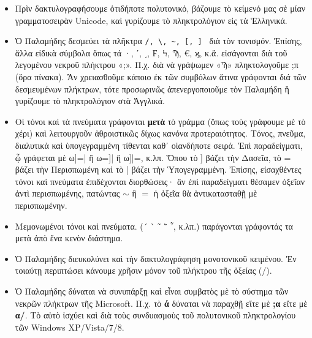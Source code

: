 \documentclass[12pt,a4paper]{article}
\begin{document}
\begin{itemize}
\begin{figure}[ht]
\begin{center}
                    \end{center}
                  \end{figure}
    \item{}Πρὶν δακτυλογραφήσουμε ὁτιδήποτε πολυτονικό, βάζουμε τὸ κείμενό 
          μας σὲ μίαν γραμματοσειρὰν Unicode, καὶ γυρίζουμε τὸ πληκτρολόγιον 
          εἰς τὰ Ἑλληνικά.
    \item{}Ὁ Παλαμήδης δεσμεύει τὰ πλῆκτρα \verb|/, \, ~, [, ] | διὰ τὸν
          τονισμόν. Ἐπίσης, ἄλλα εἰδικὰ σύμβολα ὅπως τά ·, ʹ, ͵, 
            Ϝ, Ϟ, Ϡ, €, ϗ, κ.ἄ. εἰσάγονται διὰ τοῦ λεγομένου νεκροῦ πλήκτρου
            «;». Π.χ. διὰ νὰ γράψωμεν «Ϡ» πληκτολογοῦμε ;π (ὅρα πίνακα). Ἂν
            χρειασθοῦμε κάποιο ἐκ τῶν συμβόλων ἅτινα γράφονται διά τῶν δεσμευμένων
            πλήκτρων, τότε προσωρινῶς ἀπενεργοποιοῦμε τὸν Παλαμήδη ἢ γυρίζουμε 
            τὸ πληκτρολόγιον στὰ Ἀγγλικά. 
    \item{}Οἱ τόνοι καὶ τὰ πνεύματα  γράφονται {\bf μετὰ} τὸ γράμμα
            (ὅπως τοὺς γράφουμε μὲ τὸ χέρι) καὶ λειτουργοῦν ἀθροιστικῶς
            δίχως κανόνα προτεραιότητος. Τόνος, πνεῦμα, διαλυτικὰ καὶ
            ὑπογεγραμμένη τίθενται καθ᾽ οἱανδήποτε σειρά. Ἐπὶ παραδείγματι,
            {\large ᾦ} γράφεται μὲ {\large ω]=|} ἢ {\large ω=]|}
            ἢ {\large ω]|=}, κ.λπ. Ὅπου τὸ ] βάζει τὴν Δασεῖα, τὸ
            = βάζει τὴν Περισπωμένη καὶ τὸ | βάζει τὴν Ὑπογεγραμμένη. 
            Ἐπίσης, εἰσαχθέντες τόνοι καὶ πνεύματα  ἐπιδέχονται διορθώσεις·
            ἂν ἐπὶ παραδείγματι θέσαμεν ὀξεῖαν ἀντὶ περισπωμένης, πατώντας
            {\bf$\sim$} ἢ {\bf$=$} ἡ ὀξεῖα θὰ ἀντικατασταθῇ μὲ περισπωμένην.

    \item{}Μεμονωμένοι τόνοι καὶ πνεύματα. (´{ }`{ }῀{ }῭{ }῏, κ.λπ.)  παράγονται
            γράφοντάς τα μετὰ ἀπὸ ἕνα κενὸν διάστημα.
    \item{}Ὁ Παλαμήδης διευκολύνει καὶ τὴν δακτυλογράφηση μονοτονικοῦ
           κειμένου. Ἐν τοιαύτῃ
            περιπτώσει κάνουμε χρῆσιν μόνον τοῦ πλήκτρου τῆς ὀξείας (/).
    \item{}Ὁ Παλαμήδης δύναται νὰ συνυπάρξῃ καὶ εἶναι συμβατὸς μὲ τὸ σύστημα τῶν
            νεκρῶν πλήκτρων τῆς Microsoft.  Π.χ.  τὸ {\bf ά} δύναται νὰ παραχθῇ
            εἴτε μὲ {\bf ;α} εἴτε μὲ {\bf α/}.  Τὸ αὐτὸ ἰσχύει καὶ διὰ τοὺς
            συνδυασμοὺς τοῦ πολυτονικοῦ πληκτρολογίου τῶν Windows
            XP/Vista/7/8.
  \end{itemize}

\end{document}
